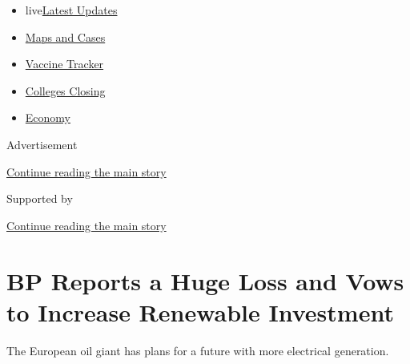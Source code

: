 \begin{itemize}
\tightlist
\item
  live\href{https://www.nytimes3xbfgragh.onion/2020/08/20/world/coronavirus-covid.html?name=styln-coronavirus-markets\&region=TOP_BANNER\&variant=undefined\&block=storyline_menu_recirc\&action=click\&pgtype=Article\&impression_id=4986d081-e38c-11ea-ba56-c354277706d3}{Latest
  Updates}
\item
  \href{https://www.nytimes3xbfgragh.onion/interactive/2020/us/coronavirus-us-cases.html?name=styln-coronavirus-markets\&region=TOP_BANNER\&variant=undefined\&block=storyline_menu_recirc\&action=click\&pgtype=Article\&impression_id=4986d082-e38c-11ea-ba56-c354277706d3}{Maps
  and Cases}
\item
  \href{https://www.nytimes3xbfgragh.onion/interactive/2020/science/coronavirus-vaccine-tracker.html?name=styln-coronavirus-markets\&region=TOP_BANNER\&variant=undefined\&block=storyline_menu_recirc\&action=click\&pgtype=Article\&impression_id=4986f790-e38c-11ea-ba56-c354277706d3}{Vaccine
  Tracker}
\item
  \href{https://www.nytimes3xbfgragh.onion/2020/08/19/us/colleges-closing-covid.html?name=styln-coronavirus-markets\&region=TOP_BANNER\&variant=undefined\&block=storyline_menu_recirc\&action=click\&pgtype=Article\&impression_id=4986f791-e38c-11ea-ba56-c354277706d3}{Colleges
  Closing}
\item
  \href{https://www.nytimes3xbfgragh.onion/live/2020/08/20/business/stock-market-today-coronavirus?name=styln-coronavirus-markets\&region=TOP_BANNER\&variant=undefined\&block=storyline_menu_recirc\&action=click\&pgtype=Article\&impression_id=4986f792-e38c-11ea-ba56-c354277706d3}{Economy}
\end{itemize}

Advertisement

\protect\hyperlink{after-top}{Continue reading the main story}

Supported by

\protect\hyperlink{after-sponsor}{Continue reading the main story}

\hypertarget{bp-reports-a-huge-loss-and-vows-to-increase-renewable-investment}{%
\section{BP Reports a Huge Loss and Vows to Increase Renewable
Investment}\label{bp-reports-a-huge-loss-and-vows-to-increase-renewable-investment}}

The European oil giant has plans for a future with more electrical
generation.

